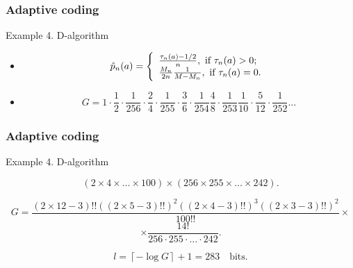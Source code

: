 \documentclass[14pt]{beamer}
\begin{document}
\begin{frame}
\frametitle{Adaptive coding}
Example 4. D-algorithm
\begin{itemize}    

    \item  
    \begin{equation}
    \label{eq3_41} \hat {p}_n (a) = \left\{ {{\begin{array}{*{20}c}
     {\frac{\tau _n (a) - 1 / 2}{n},\mbox{ if }\tau _n (a) > 0;} \hfill \\
     {\frac{M_n }{2n}\frac{1}{M - M_n },\mbox{ if }\tau _n (a) = 0.} \hfill \\
    \end{array} }} \right.
    \end{equation}


    \item 
    \[
    G = 1 \cdot \frac{1}{2} \cdot \frac{1}{256} \cdot \frac{2}{4} \cdot
    \frac{1}{255} \cdot \frac{3}{6} \cdot \frac{1}{254}\frac{4}{8} \cdot
    \frac{1}{253}\frac{1}{10} \cdot \frac{5}{12} \cdot \frac{1}{252}...
    \]

\end{itemize}
\end{frame}


\begin{frame}
\frametitle{Adaptive coding}
Example 4. D-algorithm
\begin{itemize}    
\small{
    \item 
    \[
    (2\times 4\times \ldots \times 100)\times (256\times 255\times
    \ldots \times 242).
    \]

    \item{ 
\footnotesize { 
    \[
    G = \frac{(2\times 12 - 3)!!((2\times 5 - 3)!!)^2((2\times 4 -
    3)!!)^3((2\times 3 - 3)!!)^2}{100!!} \times 
    \]
}    
    \[
    \times\frac{14!}{256 \cdot 255 \cdot ... \cdot 242}.
    \]
    }
    
    \item 
    \[
    l = \left\lceil { - \log G} \right\rceil + 1 = 283 \quad \mbox{bits}.
    \]
}
\end{itemize}
\end{frame}



\end{document}
